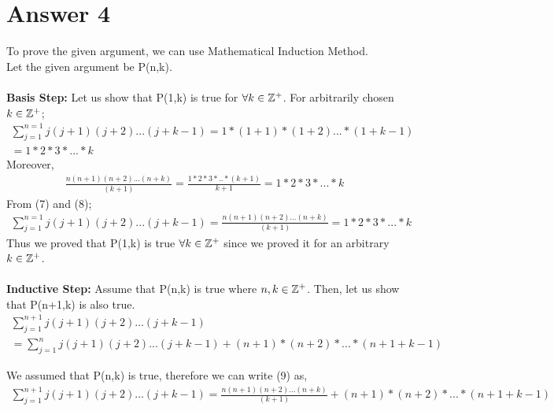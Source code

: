 \documentclass[12pt]{article}
\newcommand{\Z}{\mathbb{Z}}
\begin{document}
\section*{Answer 4}
To prove the given argument, we can use Mathematical Induction Method.\\
Let the given argument be P(n,k).\\ \\
\textbf{Basis Step:} Let us show that P(1,k) is true for $\forall k\in \Z\textsuperscript{+}$. For arbitrarily chosen $k\in \Z\textsuperscript{+}$; 
\begin{equation}
\begin{split}
\sum_{j=1}^{n=1}j(j+1)(j+2)...(j+k-1) = 1*(1+1)*(1+2)...*(1+k-1) & \\ = 1*2*3*...*k
\end{split}
\end{equation}
Moreover,
\begin{equation}
\begin{split}
\frac{n(n+1)(n+2)...(n+k)}{(k+1)} = \frac{1*2*3*..*(k+1)}{k+1} = 1*2*3*...*k
\end{split}
\end{equation}
From (7) and (8);
\begin{equation*}
\begin{split}
\sum_{j=1}^{n=1}j(j+1)(j+2)...(j+k-1) = \frac{n(n+1)(n+2)...(n+k)}{(k+1)} = 1*2*3*...*k
\end{split}
\end{equation*}
Thus we proved that P(1,k) is true $\forall k\in \Z\textsuperscript{+}$ since we proved it for an arbitrary $k \in \Z\textsuperscript{+}$. \\ \\
\textbf{Inductive Step:} Assume that P(n,k) is true where $n,k\in \Z\textsuperscript{+}$.
Then, let us show that P(n+1,k) is also true.
\begin{equation}
\begin{split}
\sum_{j=1}^{n+1}j(j+1)(j+2)...(j+k-1) & \\ = \sum_{j=1}^{n}j(j+1)(j+2)...(j+k-1) + (n+1)*(n+2)*...*(n+1+k-1)
\end{split}
\end{equation}

We assumed that P(n,k) is true, therefore we can write (9) as,
\begin{equation}
\begin{split}
\sum_{j=1}^{n+1}j(j+1)(j+2)...(j+k-1)  = \frac{n(n+1)(n+2)...(n+k)}{(k+1)} + (n+1)*(n+2)*...*(n+1+k-1)
\end{split}
\end{equation}
\end{document}
